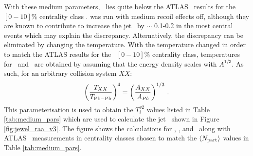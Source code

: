 

With these medium parameters, \jewel\ lies quite below the ATLAS \RAA\ results for the \PbPb\ $[0-10]\%$ centrality class \cite{Aaboud:2018twu}. \jewel was run with medium recoil effects off, although they are known to contribute to increase the jet \RAA\ by $\sim$ 0.1-0.2 in the most central events \cite{KunnawalkamElayavalli:2017hxo} which may explain the discrepancy. Alternatively, the discrepancy can be eliminated by changing the temperature.  With the temperature changed in order to match the ATLAS results for the \PbPb\ $[0-10]\%$ centrality class, temperatures for \XeXe\ and \ArAr\ are obtained by assuming that the energy density scales with $A^{1/3}$. As such, for an arbitrary collision system $XX$:
\begin{equation}
    \left( \frac{T_{XX}}{T_{\rm Pb-Pb}} \right )^{4} = \left( \frac{A_{XX}}{A_{Pb}} \right)^{1/3} \, .
\end{equation}
This parameterisation is used to obtain the $T_i^{v2}$ values listed in Table \ref{tab:medium_pars} which are used to calculate the jet \RAA\ shown in Figure \ref{fig:jewel_raa_v3}.  The figure shows the \jewel calculations for \PbPb, \XeXe, and \ArAr\ along with ATLAS \PbPb\ measurements in centrality classes chosen to match the $\left\langle N_{\rm part} \right\rangle$ values in Table \ref{tab:medium_pars}.

